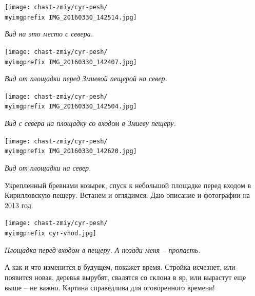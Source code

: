 \begin{center}
\texttt{[image: chast-zmiy/cyr-pesh/\\myimgprefix IMG\_20160330\_142514.jpg]}

\textit{Вид на это место с севера.}
\end{center}





\begin{center}
\texttt{[image: chast-zmiy/cyr-pesh/\\myimgprefix IMG\_20160330\_142407.jpg]}

\textit{Вид от площадки перед Змиевой пещерой на север.}
\end{center}


\newpage

\begin{center}
\texttt{[image: chast-zmiy/cyr-pesh/\\myimgprefix IMG\_20160330\_142504.jpg]}

\textit{Вид с севера на площадку со входом в Змиеву пещеру.}
\end{center}


\begin{center}
\texttt{[image: chast-zmiy/cyr-pesh/\\myimgprefix IMG\_20160330\_142620.jpg]}

\textit{Вид от площадки на север.}
\end{center}

\newpage

Укрепленный бревнами козырек, спуск к небольшой площадке перед входом в Кирилловскую пещеру. Встанем и оглядимся. Даю описание и фотографии на 2013 год. 

\begin{center}
\texttt{[image: chast-zmiy/cyr-pesh/\\myimgprefix cyr-vhod.jpg]}
\end{center}

\textit{Площадка перед входом в пещеру. А позади меня – пропасть.}

А как и что изменится в будущем, покажет время. Стройка исчезнет, или появится новая, деревья вырубят, свалятся со склона в яр, или вырастут еще выше – не важно. Картина справедлива для оговоренного времени!

